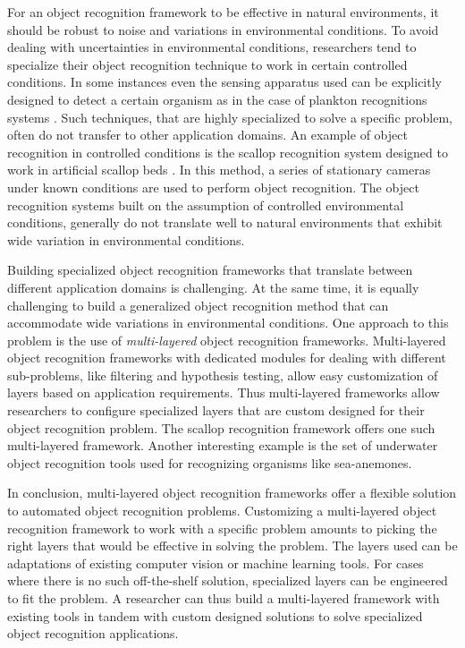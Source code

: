 \documentclass {udthesis}
\begin{document}
For an object recognition framework to be effective in natural environments, it
should be robust to noise and variations in environmental conditions. 
To avoid dealing with uncertainties in environmental conditions, researchers tend to specialize their object recognition technique to work in certain controlled conditions. In some instances even the sensing apparatus used can be explicitly designed to detect a certain organism as in the case of plankton 
recognitions systems \cite{mcgavin_plankton, stelzer_rotifier}. 
Such techniques, that are highly specialized to solve a specific problem, 
often do not transfer to other application domains. An example of object recognition in controlled conditions is the scallop recognition system designed to work in artificial scallop beds \cite{enomoto9,enomoto10}. In this method, a series of stationary cameras under known conditions are used to perform object recognition. The object recognition systems built on the assumption of controlled environmental conditions, generally do not translate well to natural environments that exhibit wide variation in environmental conditions.

Building specialized object recognition frameworks that translate between different application domains is challenging. 
At the same time, it is equally challenging to build a generalized object recognition method that can accommodate wide variations in environmental conditions. 
One approach to this problem is the use of \emph{multi-layered} object recognition frameworks. Multi-layered object recognition frameworks with dedicated modules for dealing with different sub-problems, like filtering and hypothesis testing, allow easy customization of layers based on application requirements. 
Thus multi-layered frameworks allow researchers to configure specialized layers that are custom designed for their object recognition problem. The scallop
recognition framework \cite{prasanna_aslo, prasanna_igi} offers one such multi-layered framework. Another interesting example is the set of underwater object recognition tools \cite{schoening} used for recognizing organisms like sea-anemones.

In conclusion, multi-layered object recognition frameworks offer a flexible solution to automated object recognition problems. Customizing a multi-layered object recognition framework to work with a specific problem amounts to picking the right layers that would be effective in solving the problem. The layers used can be adaptations of existing computer vision or machine learning tools. For cases where there is no such off-the-shelf solution, specialized layers can be engineered to fit the problem. A researcher can thus build a multi-layered framework with existing tools in tandem with custom designed solutions to solve specialized object recognition applications.
\end{document}
